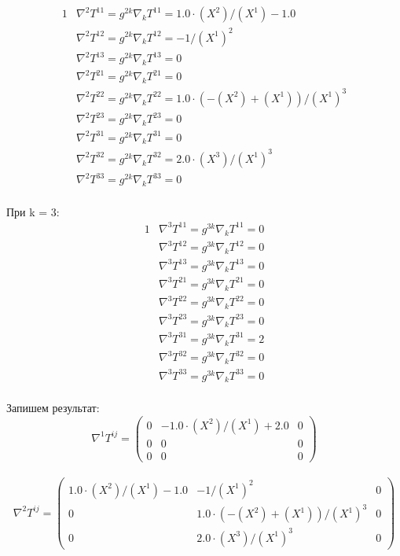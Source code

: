 \documentclass{article}
\begin{document}
\begin{alignat*}{1}
  & \nabla^2T^{11} = g^{2k}\nabla_kT^{11} = 1.0\cdot (X^2)/(X^1) - 1.0 \\
  & \nabla^2T^{12} = g^{2k}\nabla_kT^{12} = -1/(X^1)^2 \\
  & \nabla^2T^{13} = g^{2k}\nabla_kT^{13} = 0 \\
  & \nabla^2T^{21} = g^{2k}\nabla_kT^{21} = 0 \\
  & \nabla^2T^{22} = g^{2k}\nabla_kT^{22} = 1.0\cdot (-(X^2) + (X^1))/(X^1)^3 \\
  & \nabla^2T^{23} = g^{2k}\nabla_kT^{23} = 0 \\
  & \nabla^2T^{31} = g^{2k}\nabla_kT^{31} = 0 \\
  & \nabla^2T^{32} = g^{2k}\nabla_kT^{32} = 2.0\cdot (X^3)/(X^1)^3 \\
  & \nabla^2T^{33} = g^{2k}\nabla_kT^{33} = 0 
\end{alignat*}\\
При k = 3:\\
\begin{alignat*}{1}
  & \nabla^3T^{11} = g^{3k}\nabla_kT^{11} = 0 \\
  & \nabla^3T^{12} = g^{3k}\nabla_kT^{12} = 0 \\
  & \nabla^3T^{13} = g^{3k}\nabla_kT^{13} = 0 \\
  & \nabla^3T^{21} = g^{3k}\nabla_kT^{21} = 0 \\
  & \nabla^3T^{22} = g^{3k}\nabla_kT^{22} = 0 \\
  & \nabla^3T^{23} = g^{3k}\nabla_kT^{23} = 0 \\
  & \nabla^3T^{31} = g^{3k}\nabla_kT^{31} = 2 \\
  & \nabla^3T^{32} = g^{3k}\nabla_kT^{32} = 0 \\
  & \nabla^3T^{33} = g^{3k}\nabla_kT^{33} = 0 
\end{alignat*}\\
Запишем результат:\\
\[
\nabla^1T^{ij} = \begin{pmatrix}
	0 & -1.0\cdot (X^2)/(X^1) + 2.0 & 0\\
	0 & 0 & 0\\
	0 & 0 & 0
\end{pmatrix}
\]\\
\[
\nabla^2T^{ij} = \begin{pmatrix}
	1.0\cdot (X^2)/(X^1) - 1.0 & -1/(X^1)^2 & 0\\
	0 & 1.0\cdot (-(X^2) + (X^1))/(X^1)^3 & 0\\
	0 & 2.0\cdot (X^3)/(X^1)^3 & 0
\end{pmatrix}
\]\\
\end{document}
